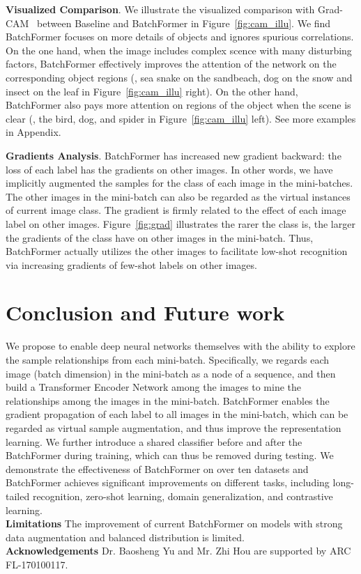 \documentclass[10pt,twocolumn,letterpaper]{article}
\begin{document}
{\bf Visualized Comparison}.
We illustrate the visualized comparison with Grad-CAM~\cite{selvaraju2017grad} between Baseline and BatchFormer in Figure~\ref{fig:cam_illu}. We find BatchFormer focuses on more details of objects and ignores spurious correlations.
On the one hand, when the image includes complex scence with many disturbing factors, BatchFormer effectively improves the attention of the network on the corresponding object regions (\eg, sea snake on the sandbeach, dog on the snow and insect on the leaf in Figure~\ref{fig:cam_illu} right). On the other hand, BatchFormer also pays more attention on regions of the object when the scene is clear (\eg, the bird, dog, and spider in Figure~\ref{fig:cam_illu} left). See more examples in Appendix.


{\bf Gradients Analysis}.
BatchFormer has increased new gradient backward: the loss of each label has the gradients on other images. In other words, we have implicitly augmented the samples for the class of each image in the mini-batches. The other images in the mini-batch can also be regarded as the virtual instances of current image class.  The gradient is firmly related to the effect of each image label on other images. Figure~\ref{fig:grad} illustrates the rarer the class is, the larger the gradients of the class have on other images in the mini-batch. Thus, BatchFormer actually utilizes the other images to facilitate low-shot recognition via increasing gradients of few-shot labels on other images.






\section{Conclusion and Future work}

We propose to enable deep neural networks themselves with the ability to explore the sample relationships from each mini-batch. Specifically, we regards each image (batch  dimension) in the mini-batch as a node of a sequence, and then build a Transformer Encoder Network among the images to mine the relationships among the images in the mini-batch. BatchFormer enables the gradient propagation of each label to all images in the mini-batch, which can be regarded as virtual sample augmentation, and thus improve the representation learning. We further introduce a shared classifier before and after the BatchFormer during training,  which can thus be removed during testing.  We demonstrate the effectiveness of BatchFormer on over ten datasets and BatchFormer achieves significant improvements on different tasks, including long-tailed recognition, zero-shot learning, domain generalization, and contrastive learning. \\
{\small
{\bf Limitations} The improvement of current BatchFormer on models with strong data augmentation and balanced distribution is limited. \\
{\bf Acknowledgements} {\small Dr. Baosheng Yu and Mr. Zhi Hou are supported by ARC FL-170100117.}}
\end{document}
